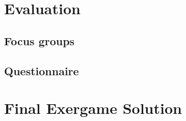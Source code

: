 \section{Evaluation}
\subsection{Focus groups}
\subsection{Questionnaire}
\section{Final Exergame Solution}